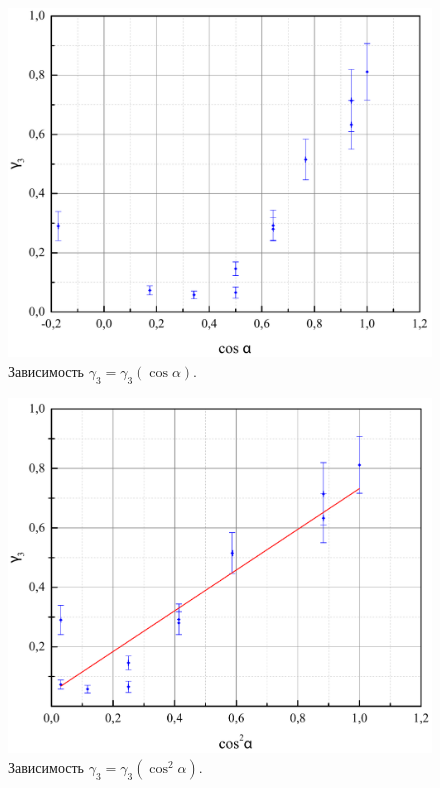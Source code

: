 \documentclass[a4paper,12pt]{article}
\begin{document}
\begin{figure}[h]
\includegraphics[scale=0.6]{graph1.pdf}
\centering
\caption{Зависимость $\gamma_3 = \gamma_3(\cos \alpha)$.}
\end{figure}

\begin{figure}[h]
\includegraphics[scale=0.6]{graph2.pdf}
\centering
\caption{Зависимость $\gamma_3 = \gamma_3(\cos^2 \alpha)$.}
\end{figure}
\end{document}
